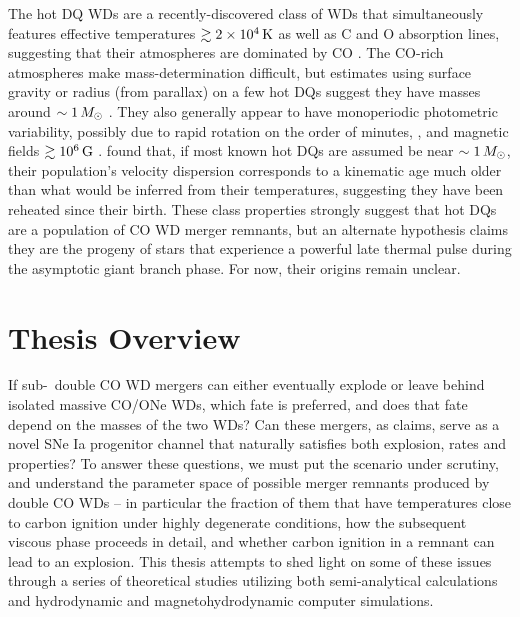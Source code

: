 The hot DQ WDs are a recently-discovered class of WDs that simultaneously features effective temperatures $\gtrsim2\times10^4\,\mathrm{K}$ as well as C and O absorption lines, suggesting that their atmospheres are dominated by CO \citep{dufo+07, dufo+08}.  The CO-rich atmospheres make mass-determination difficult, but estimates using surface gravity or radius (from parallax) on a few hot DQs suggest they have masses around $\sim1\,\Msun$ \citep{dufo+11, dunl15thesis}.  They also generally appear to have monoperiodic photometric variability, possibly due to rapid rotation on the order of minutes, \cite{lawr+13, will+16}, and magnetic fields $\gtrsim10^6\,\mathrm{G}$ \citep{dufo+13}.  \citep{dunlc15} found that, if most known hot DQs are assumed be near $\sim1\,\Msun$, their population's velocity dispersion corresponds to a kinematic age much older than what would be inferred from their temperatures, suggesting they have been reheated since their birth.  These class properties strongly suggest that hot DQs are a population of CO WD merger remnants, but an alternate hypothesis \citep{dufo+07, alth+09} claims they are the progeny of stars that experience a powerful late thermal pulse during the asymptotic giant branch phase.  For now, their origins remain unclear.


\section{Thesis Overview}

If sub-\Mch\ double CO WD mergers can either eventually explode or leave behind isolated massive CO/ONe WDs, which fate is preferred, and does that fate depend on the masses of the two WDs?  Can these mergers, as \citeal{vkercj10} claims, serve as a novel SNe Ia progenitor channel that naturally satisfies both explosion, rates and properties?  To answer these questions, we must put the \citeal{vkercj10} scenario under scrutiny, and understand the parameter space of possible merger remnants produced by double CO WDs -- in particular the fraction of them that have temperatures close to carbon ignition under highly degenerate conditions, how the subsequent viscous phase proceeds in detail, and whether carbon ignition in a remnant can lead to an explosion.  This thesis attempts to shed light on some of these issues through a series of theoretical studies utilizing both semi-analytical calculations and hydrodynamic and magnetohydrodynamic computer simulations.

